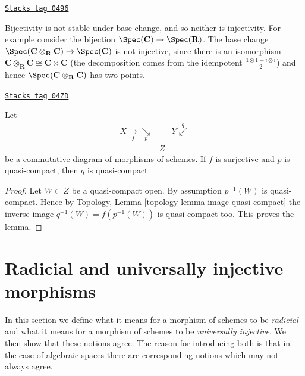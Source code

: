 \begin{example}
\label{morphisms-example-injective-not-preserved-base-change}
\href{https://stacks.math.columbia.edu/tag/0496}{\texttt{Stacks tag 0496}}

Bijectivity is not stable under base change, and so neither is injectivity.
For example consider the bijection
$\Spec(\mathbf{C}) \to \Spec(\mathbf{R})$.
The base change
$\Spec(\mathbf{C} \otimes_{\mathbf{R}} \mathbf{C}) \to
\Spec(\mathbf{C})$
is not injective, since there is an isomorphism
$\mathbf{C} \otimes_{\mathbf{R}} \mathbf{C} \cong \mathbf{C} \times \mathbf{C}$
(the decomposition comes from the idempotent
$\frac{1 \otimes 1 + i \otimes i}{2}$) and hence
$\Spec(\mathbf{C} \otimes_{\mathbf{R}} \mathbf{C})$ has two points.
\end{example}

\begin{lemma}
\label{morphisms-lemma-surjection-from-quasi-compact}
\href{https://stacks.math.columbia.edu/tag/04ZD}{\texttt{Stacks tag 04ZD}}

Let
$$
\begin{array}{ccc}X \underset{f}{\longrightarrow}\underset{p}{\searrow} &  & Y \overset{q}{\swarrow} \\  & Z & \end{array}
$$
be a commutative diagram of morphisms of schemes.
If $f$ is surjective and $p$ is quasi-compact, then $q$ is quasi-compact.
\end{lemma}

\begin{proof}
Let $W \subset Z$ be a quasi-compact open. By assumption $p^{-1}(W)$
is quasi-compact. Hence by
Topology, Lemma \ref{topology-lemma-image-quasi-compact}
the inverse image $q^{-1}(W) = f(p^{-1}(W))$ is quasi-compact too.
This proves the lemma.
\end{proof}

\section{Radicial and universally injective morphisms}
\label{morphisms-section-radicial}
In this section we define what it means for a morphism of schemes to
be {\it radicial} and what it means for a morphism of schemes to be
{\it universally injective}. We then show that these notions agree.
The reason for introducing both is that in the case of algebraic spaces
there are corresponding notions which may not always agree.

